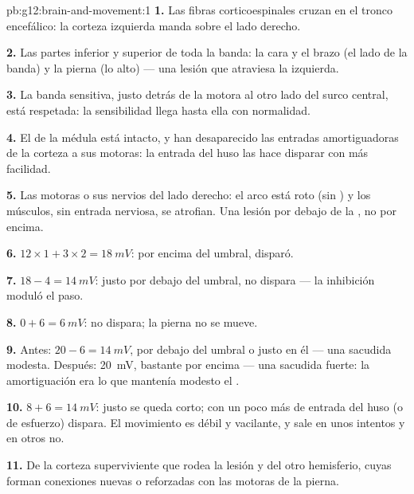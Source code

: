 \begin{solution}{pb:g12:brain-and-movement:1}
\textbf{1.} Las fibras corticoespinales cruzan en el tronco encefálico:
la corteza izquierda manda sobre el lado derecho.

\textbf{2.} Las partes inferior y superior de toda la banda: la cara y
el brazo (el lado de la banda) y la pierna (lo alto) --- una lesión que
atraviesa la  izquierda.

\textbf{3.} La banda sensitiva, justo detrás de la motora al otro lado
del surco central, está respetada: la sensibilidad llega hasta ella con
normalidad.

\textbf{4.} El  de la médula está intacto, y han
desaparecido las entradas amortiguadoras de la corteza a sus 
motoras: la entrada del huso las hace disparar con más facilidad.

\textbf{5.} Las  motoras o sus nervios del lado derecho: el
arco está roto (sin ) y los músculos, sin entrada nerviosa, se
atrofian. Una lesión por debajo de la , no por encima.

\textbf{6.} $12 \times 1 + 3 \times 2 = \qty{18}{mV}$: por encima del
umbral, disparó.

\textbf{7.} $18 - 4 = \qty{14}{mV}$: justo por debajo del umbral, no
dispara --- la inhibición moduló el paso.

\textbf{8.} $0 + 6 = \qty{6}{mV}$: no dispara; la pierna no se mueve.

\textbf{9.} Antes: $20 - 6 = \qty{14}{mV}$, por debajo del umbral o
justo en él --- una sacudida modesta. Después: \qty{20}{mV}, bastante
por encima --- una sacudida fuerte: la amortiguación era lo que
mantenía modesto el .

\textbf{10.} $8 + 6 = \qty{14}{mV}$: justo se queda corto; con un poco
más de entrada del huso (o de esfuerzo) dispara. El movimiento es débil
y vacilante, y sale en unos intentos y en otros no.

\textbf{11.} De la corteza superviviente que rodea la lesión y del otro
hemisferio, cuyas  forman conexiones nuevas o reforzadas con
las  motoras de la pierna.


\end{solution}

